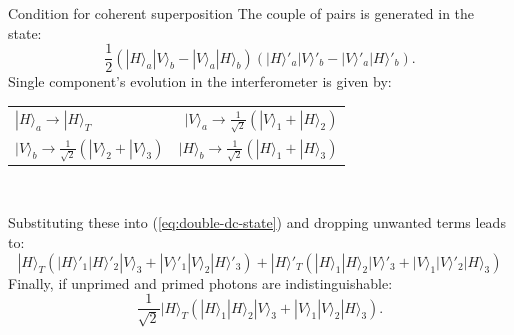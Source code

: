 \documentclass[10pt]{beamer}
\begin{document}
\begin{frame}{Condition for coherent superposition}
  The couple of pairs is generated in the state:
  \begin{equation}
    \frac{1}{2} \left( |H\rangle_a |V\rangle_b - |V\rangle_a |H\rangle_b \right) \left( |H\rangle'_a |V\rangle'_b - |V\rangle'_a |H\rangle'_b \right).
    \label{eq:double-dc-state}
  \end{equation}
  Single component's evolution in the interferometer is given by:
  \begin{center}
    \renewcommand{\arraystretch}{1.5}
    \begin{tabular}{l r}
      $|H\rangle_a \rightarrow |H\rangle_T$ & $|V\rangle_a \rightarrow \frac{1}{\sqrt{2}} \left( |V\rangle_1 + |H\rangle_2 \right)$\\
      $|V\rangle_b \rightarrow \frac{1}{\sqrt{2}} \left( |V\rangle_2 + |V\rangle_3 \right)$ & $|H\rangle_b \rightarrow \frac{1}{\sqrt{2}} \left( |H\rangle_1 + |H\rangle_3 \right)$
    \end{tabular}\\
    \end{center}
  Substituting these into (\ref{eq:double-dc-state}) and dropping unwanted terms leads to:
  \begin{equation*}
|H\rangle_T \left( |H\rangle'_1 |H\rangle'_2 |V\rangle_3 + |V\rangle'_1 |V\rangle_2 |H\rangle'_3 \right) + |H\rangle'_T \left( |H\rangle_1 |H\rangle_2 |V\rangle'_3 + |V\rangle_1 |V\rangle'_2 |H\rangle_3 \right)
  \end{equation*}
  Finally, if unprimed and primed photons are indistinguishable:
  \begin{equation*}
    \frac{1}{\sqrt{2}} |H\rangle_T \left( |H\rangle_1 |H\rangle_2 |V\rangle_3 + |V\rangle_1 |V\rangle_2 |H\rangle_3 \right).
  \end{equation*}
\end{frame}
\end{document}
